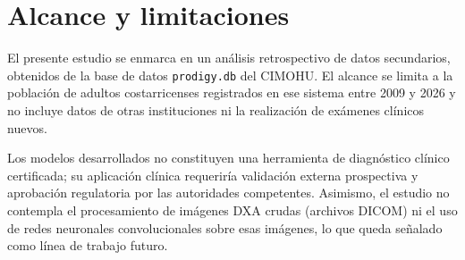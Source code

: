 \documentclass[../tesis.tex]{subfiles}
\begin{document}
\section{Alcance y limitaciones}
\label{scope}

El presente estudio se enmarca en un análisis retrospectivo de datos secundarios, obtenidos de la base de datos \texttt{prodigy.db} del CIMOHU. El alcance se limita a la población de adultos costarricenses registrados en ese sistema entre 2009 y 2026 y no incluye datos de otras instituciones ni la realización de exámenes clínicos nuevos.

Los modelos desarrollados no constituyen una herramienta de diagnóstico clínico certificada; su aplicación clínica requeriría validación externa prospectiva y aprobación regulatoria por las autoridades competentes. Asimismo, el estudio no contempla el procesamiento de imágenes DXA crudas (archivos DICOM) ni el uso de redes neuronales convolucionales sobre esas imágenes, lo que queda señalado como línea de trabajo futuro.
\end{document}
